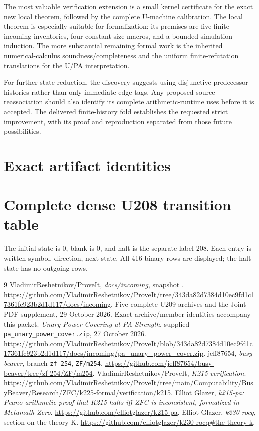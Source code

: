 \documentclass[11pt,letterpaper]{article}
\newcommand{\code}[1]{\texttt{#1}}
\begin{document}
The most valuable verification extension is a small kernel certificate for
the exact new local theorem, followed by the complete U-machine calibration.
The local theorem is especially suitable for formalization: its premises
are five finite incoming inventories, four constant-size macros, and a
bounded simulation induction. The more substantial remaining formal work
is the inherited numerical-calculus soundness/completeness and the
uniform finite-refutation translations for the U/PA interpretation.

For further state reduction, the discovery suggests using disjunctive
predecessor histories rather than only immediate edge tags. Any proposed
source reassociation should also identify its complete arithmetic-runtime
uses before it is accepted. The delivered finite-history fold establishes the
requested strict improvement, with its proof and reproduction separated
from those future possibilities.

\appendix
\newpage
\section{Exact artifact identities}

\newpage
\section{Complete dense U208 transition table}
The initial state is 0, blank is 0, and halt is the separate label 208.
Each entry is written symbol, direction, next state. All 416 binary rows
are displayed; the halt state has no outgoing rows.


\begin{thebibliography}{9}
VladimirReshetnikov/ProveIt, \emph{docs/incoming}, snapshot
.
\url{https://github.com/VladimirReshetnikov/ProveIt/tree/343da82d7384d10ec9fd1c17361fc923b2d1d117/docs/incoming}.
Five complete U209 archives and the Joint PDF supplement, 29 October 2026.
Exact archive/member identities accompany this packet.
\emph{Unary Power Covering at PA Strength}, supplied
\code{pa\_unary\_power\_cover.zip}, 27 October 2026.
\url{https://github.com/VladimirReshetnikov/ProveIt/blob/343da82d7384d10ec9fd1c17361fc923b2d1d117/docs/incoming/pa_unary_power_cover.zip}.
jeff87654, \emph{busy-beaver}, branch \code{zf-254}, \code{ZF/m254}.
\url{https://github.com/jeff87654/busy-beaver/tree/zf-254/ZF/m254}.
VladimirReshetnikov/ProveIt, \emph{K215 verification}.
\url{https://github.com/VladimirReshetnikov/ProveIt/tree/main/Computability/BusyBeaver/Research/ZFC/k225-formal/verification/k215}.
Elliot Glazer, \emph{k215-pa: Peano arithmetic proof that K215 halts iff
ZFC is inconsistent, formalized in Metamath Zero}.
\url{https://github.com/elliotglazer/k215-pa}.
Elliot Glazer, \emph{k230-rocq}, section on the theory K.
\url{https://github.com/elliotglazer/k230-rocq#the-theory-k}.
\end{thebibliography}
\end{document}
